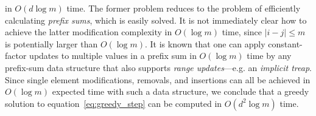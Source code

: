 \documentclass[sn-mathphys]{sn-jnl}
\begin{document}
in $O(d\log m)$ time. 
The former problem reduces to the problem of efficiently calculating \emph{prefix sums}, which is easily solved. 
It is not immediately clear how to achieve the latter modification complexity in $O(\log m)$ time, since $\lvert i - j \rvert \leq m$ is potentially larger than $O(\log m)$.  
It is known that one can apply constant-factor updates to multiple values in a prefix sum in $O(\log m)$ time by any prefix-sum data structure that also supports \emph{range updates}---e.g. an \emph{implicit treap}. 
Since single element modifications, removals, and insertions can all be achieved in $O(\log m)$ expected time with such a data structure, we conclude that a greedy solution to equation~\eqref{eq:greedy_step} can be computed in $O(d^2 \log m)$ time. 

\end{document}
